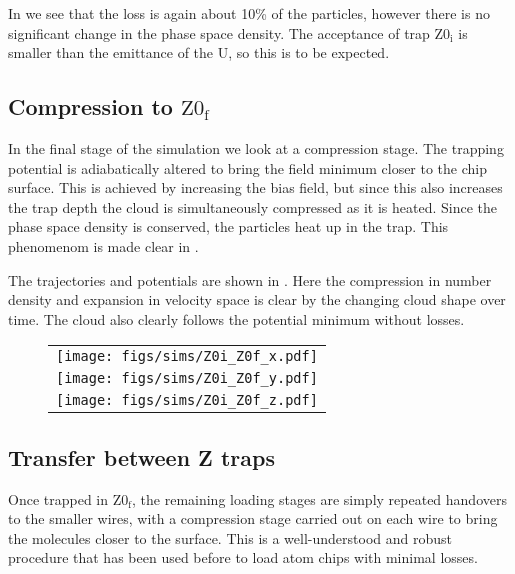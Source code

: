 In  we see that the loss is again about 10\% of
the particles, however there is no significant change in the phase space
density. The acceptance of trap $\mathrm{Z0_i}$ is smaller than the emittance
of the U, so this is to be expected.

\subsection{Compression to $\mathrm{Z0_f}$}

In the final stage of the simulation we look at a compression stage. The
trapping potential is adiabatically altered to bring the field minimum closer
to the chip surface. This is achieved by increasing the bias field, but since
this also increases the trap depth the cloud is simultaneously compressed as it
is heated. Since the phase space density is conserved, the particles heat up in
the trap. This phenomenom is made clear in .

The trajectories and potentials are shown in .
Here the compression in number density and expansion in velocity space is clear
by the changing cloud shape over time. The cloud also clearly follows the
potential minimum without losses.

\begin{figure}[p]
\centering
  \begin{tabular}{c}
    \texttt{[image: figs/sims/Z0i\_Z0f\_x.pdf]} \\
    \texttt{[image: figs/sims/Z0i\_Z0f\_y.pdf]} \\
    \texttt{[image: figs/sims/Z0i\_Z0f\_z.pdf]}
  \end{tabular}
  \caption{}
  \label{design:fig:Z0i_Z0f}
\end{figure}

\subsection{Transfer between Z traps}
\label{design:transferbetweenzs}

Once trapped in $\mathrm{Z0_f}$, the remaining loading stages are simply
repeated handovers to the smaller wires, with a compression stage carried out
on each wire to bring the molecules closer to the surface. This is a
well-understood and robust procedure that has been used before to load atom
chips with minimal losses.~\cite{} 

